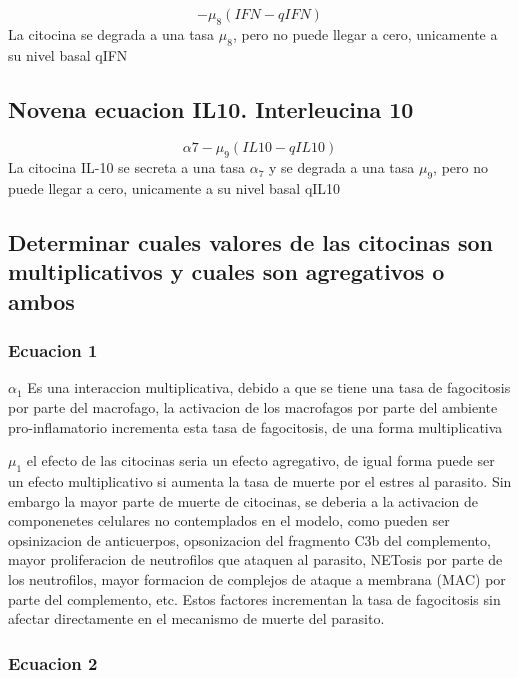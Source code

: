 \documentclass[
]{article}
\begin{document}
\[-\mu_{8}(IFN-qIFN)\] La citocina se degrada a una tasa \(\mu_{8}\),
pero no puede llegar a cero, unicamente a su nivel basal qIFN

\hypertarget{novena-ecuacion-il10.-interleucina-10}{%
\subsection{Novena ecuacion IL10. Interleucina
10}\label{novena-ecuacion-il10.-interleucina-10}}

\[ \alpha{7}-\mu_{9}(IL10-qIL10) \] La citocina IL-10 se secreta a una
tasa \(\alpha_{7}\) y se degrada a una tasa \(\mu_{9}\), pero no puede
llegar a cero, unicamente a su nivel basal qIL10

\hypertarget{determinar-cuales-valores-de-las-citocinas-son-multiplicativos-y-cuales-son-agregativos-o-ambos}{%
\subsection{Determinar cuales valores de las citocinas son
multiplicativos y cuales son agregativos o
ambos}\label{determinar-cuales-valores-de-las-citocinas-son-multiplicativos-y-cuales-son-agregativos-o-ambos}}

\hypertarget{ecuacion-1}{%
\subsubsection{Ecuacion 1}\label{ecuacion-1}}

\(\alpha_{1}\) Es una interaccion multiplicativa, debido a que se tiene
una tasa de fagocitosis por parte del macrofago, la activacion de los
macrofagos por parte del ambiente pro-inflamatorio incrementa esta tasa
de fagocitosis, de una forma multiplicativa

\(\mu_{1}\) el efecto de las citocinas seria un efecto agregativo, de
igual forma puede ser un efecto multiplicativo si aumenta la tasa de
muerte por el estres al parasito. Sin embargo la mayor parte de muerte
de citocinas, se deberia a la activacion de componenetes celulares no
contemplados en el modelo, como pueden ser opsinizacion de anticuerpos,
opsonizacion del fragmento C3b del complemento, mayor proliferacion de
neutrofilos que ataquen al parasito, NETosis por parte de los
neutrofilos, mayor formacion de complejos de ataque a membrana (MAC) por
parte del complemento, etc. Estos factores incrementan la tasa de
fagocitosis sin afectar directamente en el mecanismo de muerte del
parasito.

\hypertarget{ecuacion-2}{%
\subsubsection{Ecuacion 2}\label{ecuacion-2}}
\end{document}
